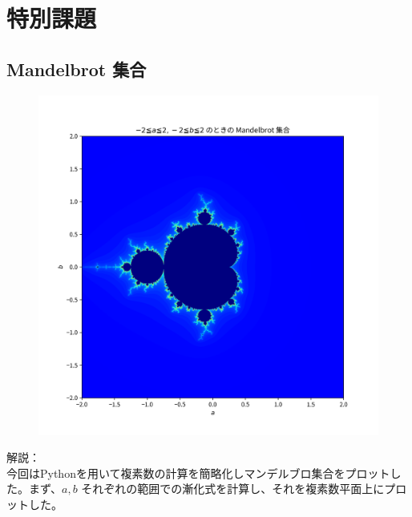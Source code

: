 \section{特別課題}
\subsection{Mandelbrot 集合}
\begin{figure}[htbp]
  \centering
  \includegraphics[keepaspectratio, scale=0.8]{images/OtherProblem/ctest5_1.png}
\end{figure}
解説：\\
今回はPythonを用いて複素数の計算を簡略化しマンデルブロ集合をプロットした。まず、$a, b$ それぞれの範囲での漸化式を計算し、それを複素数平面上にプロットした。\\
